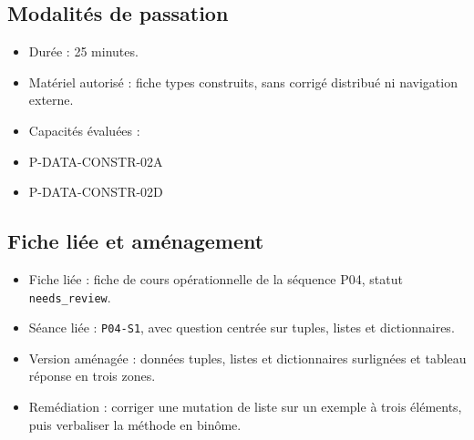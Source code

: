 \subsection{Modalités de passation}

\begin{itemize}
\tightlist
\item
  Durée : 25 minutes.
\item
  Matériel autorisé : fiche types construits, sans corrigé distribué ni
  navigation externe.
\item
  Capacités évaluées :
\item
  P-DATA-CONSTR-02A
\item
  P-DATA-CONSTR-02D
\end{itemize}

\subsection{Fiche liée et aménagement}

\begin{itemize}
\tightlist
\item
  Fiche liée : fiche de cours opérationnelle de la séquence P04, statut
  \texttt{needs\_review}.
\item
  Séance liée : \texttt{P04-S1}, avec question centrée sur tuples,
  listes et dictionnaires.
\item
  Version aménagée : données tuples, listes et dictionnaires surlignées
  et tableau réponse en trois zones.
\item
  Remédiation : corriger une mutation de liste sur un exemple à trois
  éléments, puis verbaliser la méthode en binôme.
\end{itemize}
